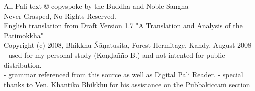 \begin{leftcolumn*}
\begin{center}
\vspace*{4cm}
{\footnotesize
All Pali text © copyspoke by the Buddha and Noble Sangha\\
Never Grasped, No Rights Reserved.\\
English translation from Draft Version 1.7 "A Translation and Analysis of the Pātimokkha"\\}
{\scriptsize
Copyright (c) 2008, Bhikkhu Ñāṇatusita, Forest Hermitage, Kandy, August 2008\\
 - used for my personal study (Koṇḍañño B.) and not intented for public distribution.\\
 - grammar referenced from this source as well as Digital Pali Reader.
 - special thanks to Ven. Khantiko Bhikkhu for his assistance on the Pubbakiccaṁ section\\}
\end{center}
\end{leftcolumn*}
